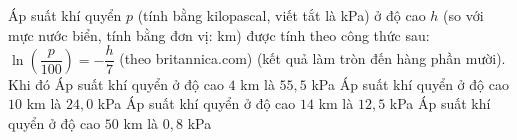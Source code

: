 \begin{ex}%
 Áp suất khí quyển $p$ (tính bằng kilopascal, viết tắt là kPa) ở độ cao $h$  (so với mực nước biển, tính bằng đơn vị: km) được tính theo công thức sau: $\ln \left(\dfrac{p}{100}\right)=-\dfrac{h}{7}$ (theo britannica.com) (kết quả làm tròn đến hàng phần mười). Khi đó
  \choiceTF
  {Áp suất khí quyển ở  độ cao $4$ km là $55{,}5$ kPa}
  {\True Áp suất khí quyển ở độ cao $10$ km là $24{,}0$ kPa} 
  {Áp suất  khí quyển ở độ cao $14$ km là $12{,}5$ kPa}
  {Áp suất  khí quyển ở độ cao $50$ km là $0{,}8$ kPa}
\end{ex}

